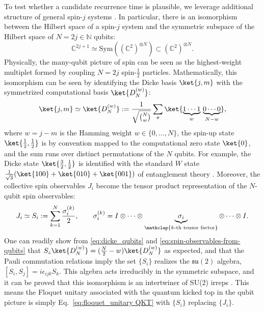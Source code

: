 \documentclass[a4paper,onecolumn,accepted=2026-04-08,10pt]{quantumarticle}
\theoremstyle{definition}
\begin{document}
To test whether a candidate recurrence time is plausible, we leverage additional structure of general spin-$j$ systems \cite{Biedenharn_Louck_Carruthers_1984}. 
In particular, there is an isomorphism between the Hilbert space of a spin-$j$ system and the symmetric subspace of the Hilbert space of $N=2j \in \mathbb N$ qubits:
\begin{equation}
    \mathbb C^{2j+1} \simeq \mathrm{Sym}((\mathbb C^2)^{\otimes N}) \subset (\mathbb C^2)^{\otimes N}. 
\end{equation}
Physically, the many-qubit picture of spin can be seen as the highest-weight multiplet formed by coupling $N=2j$ spin-$\frac12$ particles.  Mathematically, this isomorphism can be seen by identifying the Dicke basis $\ket{j,m}$ with the symmetrized computational basis $\ket{D_N^{(w)}}$:
\begin{equation}\label{eq:dicke_qubits}
    \ket{j,m} \simeq \ket{D_N^{(w)}} := \frac{1}{\sqrt{\binom{N}{w}}} \sum_{\pi} \ket{\underbrace{1 \cdots 1}_{w} \, \underbrace{0\cdots 0}_{N-w} },
\end{equation}
where $w=j-m$ is the Hamming weight $w \in \{0,...,N\}$, the spin-up state $\ket{\frac12, \frac12}$ is by convention mapped to the computational zero state $\ket{0}$, and the sum runs over distinct permutations of the $N$ qubits.  For example, the Dicke state $\ket{\frac32, \frac12}$ is identified with the standard $W$ state $\frac{1}{\sqrt{3}}(\ket{100}+\ket{010}+\ket{001})$ of entanglement theory \cite{3qubits2ways_Dur_2000}.  Moreover, the collective spin observables $J_i$ become the tensor product representation of the $N$-qubit spin observables:
\begin{equation}\label{eq:spin-observables-from-qubits}
    J_i \simeq S_i := \sum_{k=1}^{N} \frac{\sigma^{(k)}_i}{2}, \qquad \sigma^{(k)}_i = I \otimes \cdots \otimes \underbrace{\sigma_i}_{\mathclap{k\text{-th tensor factor}}} \otimes \cdots \otimes I.  
\end{equation}
One can readily show from \eqref{eq:dicke_qubits} and \eqref{eq:spin-observables-from-qubits} that $S_z\ket{D_N^{(w)}} = (\frac{N}{2}-w)\ket{D_N^{(w)}}$ as expected, and that the Pauli commutation relations imply the set $\{S_i\}$ realizes the $\mathfrak{su}(2)$ algebra, $[S_i,S_j] = i\epsilon_{ijk} S_k$.   This algebra acts irreducibly in the symmetric subspace, and it can be proved that this isomorphism is an intertwiner of SU(2) irreps \cite{harrow2013church}.  This means the Floquet unitary associated with the quantum kicked top in the qubit picture is simply Eq.\ \eqref{eq:floquet_unitary QKT} with $\{S_i\}$ replacing $\{J_i\}$.
\end{document}
